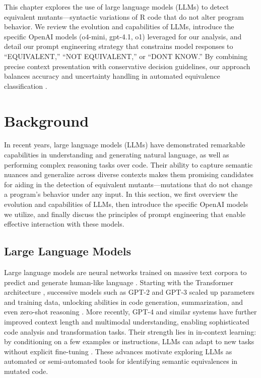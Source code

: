 
\begin{chapterabstract}
This chapter explores the use of large language models (LLMs) to detect equivalent mutants—syntactic variations of R code that do not alter program behavior. We review the evolution and capabilities of LLMs, introduce the specific OpenAI models (o4-mini, gpt-4.1, o1) leveraged for our analysis, and detail our prompt engineering strategy that constrains model responses to “EQUIVALENT,” “NOT EQUIVALENT,” or “DONT KNOW.” By combining precise context presentation with conservative decision guidelines, our approach balances accuracy and uncertainty handling in automated equivalence classification \cite{brown2020language,vaswani2017attention,openai2023api,liu2021pre,wei2022chain}.
\end{chapterabstract}

\section{Background}

In recent years, large language models (LLMs) have demonstrated remarkable capabilities in understanding and generating natural language, as well as performing complex reasoning tasks over code. Their ability to capture semantic nuances and generalize across diverse contexts makes them promising candidates for aiding in the detection of equivalent mutants—mutations that do not change a program’s behavior under any input. In this section, we first overview the evolution and capabilities of LLMs, then introduce the specific OpenAI models we utilize, and finally discuss the principles of prompt engineering that enable effective interaction with these models.

\subsection{Large Language Models}

Large language models are neural networks trained on massive text corpora to predict and generate human-like language \cite{brown2020language}. Starting with the Transformer architecture \cite{vaswani2017attention}, successive models such as GPT-2 and GPT-3 scaled up parameters and training data, unlocking abilities in code generation, summarization, and even zero-shot reasoning \cite{brown2020language,radford2019language}. More recently, GPT-4 and similar systems have further improved context length and multimodal understanding, enabling sophisticated code analysis and transformation tasks. Their strength lies in in-context learning: by conditioning on a few examples or instructions, LLMs can adapt to new tasks without explicit fine-tuning \cite{openai2023api}. These advances motivate exploring LLMs as automated or semi-automated tools for identifying semantic equivalences in mutated code.

